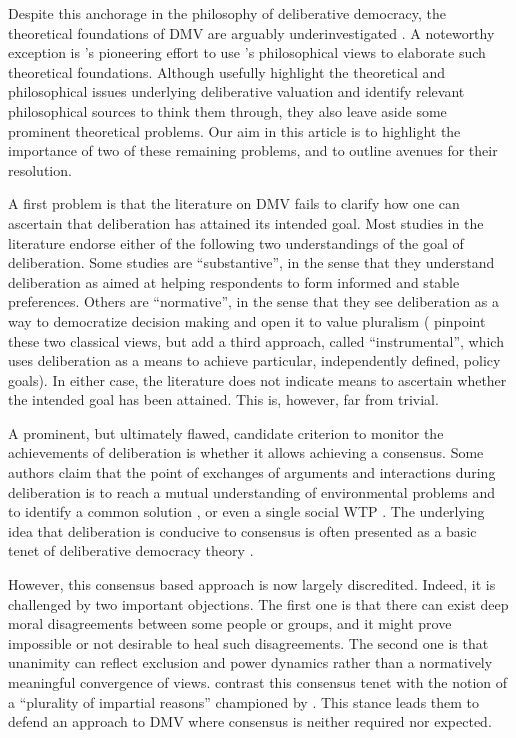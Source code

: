 \documentclass[a4paper, 11pt]{article}
\begin{document}
Despite this anchorage in the philosophy of deliberative democracy, the theoretical foundations of \ac{DMV} are arguably underinvestigated \citep{bartkowski_economic_2017,bartkowski_beyond_2018,bunse_what_2015,kenter_what_2015}. 
A noteworthy exception is \citet{bartkowski_beyond_2018}’s pioneering effort to use \citet{sen_idea_2009}’s philosophical views to elaborate such theoretical foundations. 
Although \citet{bartkowski_beyond_2018} usefully highlight the theoretical and philosophical issues underlying deliberative valuation and identify relevant philosophical sources to think them through, they also leave aside some prominent theoretical problems. 
Our aim in this article is to highlight the importance of two of these remaining problems, and to outline avenues for their resolution.

A first problem is that the literature on \ac{DMV} fails to clarify how one can ascertain that deliberation has attained its intended goal. Most studies in the literature endorse either of the following two understandings of the goal of deliberation. Some studies are “substantive”, in the sense that they understand deliberation as aimed at helping respondents to form informed and stable preferences. Others are “normative”, in the sense that they see deliberation as a way to democratize decision making and open it to value pluralism (\cite{schaafsma_guidance_2018} pinpoint these two classical views, but add a third approach, called “instrumental”, which uses deliberation as a means to achieve particular, independently defined, policy goals). In either case, the literature does not indicate means to ascertain whether the intended goal has been attained. This is, however, far from trivial.

A prominent, but ultimately flawed, candidate criterion to monitor the achievements of deliberation is whether it allows achieving a consensus. Some authors claim that the point of exchanges of arguments and interactions during deliberation is to reach a mutual understanding of environmental problems and to identify a common solution \citep{vatn_institutional_2009}, or even a single social \ac{WTP} \citep{orchard-webb_deliberative_2016}. The underlying idea that deliberation is conducive to consensus is often presented as a basic tenet of deliberative democracy theory \citep{wilson_discourse-based_2002}. 

However, this consensus based approach is now largely discredited. Indeed, it is challenged by two important objections.
The first one is that there can exist deep moral disagreements \citep{dryzek_deliberative_2013} between some people or groups, and it might prove impossible or not desirable to heal such disagreements.
The second one is that unanimity can reflect exclusion and power dynamics \citep{elster_sour_1983,volker_exploring_2016,vargas_background_2016,vargas_problem_2017,murphy_comparing_2017} rather than a normatively meaningful convergence of views.
\citeauthor{bartkowski_beyond_2018} contrast this consensus tenet with the notion of a “plurality of impartial reasons” championed by \citet{sen_idea_2009}.
This stance leads them to defend an approach to \ac{DMV} where consensus is neither required nor expected.
\end{document}
